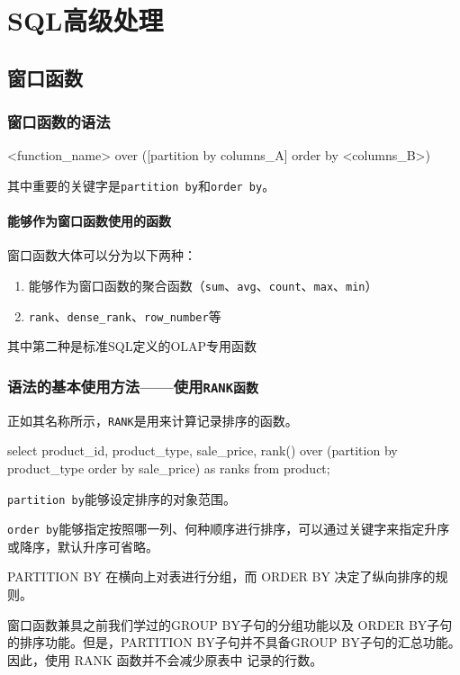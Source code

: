 \chapter{SQL高级处理}
\section{窗口函数}
\subsection{窗口函数的语法}
\begin{sqlc}
<function_name> over ([partition by columns_A] order by <columns_B>)
\end{sqlc}

其中重要的关键字是\verb|partition by|和\verb|order by|。 

\subsubsection{能够作为窗口函数使用的函数}
窗口函数大体可以分为以下两种：
\begin{enumerate}
\item 能够作为窗口函数的聚合函数（\verb|sum|、\verb|avg|、\verb|count|、\verb|max|、\verb|min|）
\item \verb|rank|、\verb|dense_rank|、\verb|row_number|等
\end{enumerate}
其中第二种是标准SQL定义的OLAP专用函数

\subsection{语法的基本使用方法——使用\texttt{RANK函数}}
正如其名称所示，\verb|RANK|是用来计算记录排序的函数。

\begin{sqlc}
select product_id, product_type, sale_price,
	rank() over (partition by product_type order by sale_price) as ranks
    from product;
\end{sqlc}

\verb|partition by|能够设定排序的对象范围。

\verb|order by|能够指定按照哪一列、何种顺序进行排序，可以通过关键字来指定升序或降序，默认升序可省略。

PARTITION BY 在横向上对表进行分组，而 ORDER BY
决定了纵向排序的规则。

窗口函数兼具之前我们学过的GROUP BY子句的分组功能以及
ORDER BY子句的排序功能。但是，PARTITION BY子句并不具备GROUP BY子句的汇总功能。因此，使用 RANK 函数并不会减少原表中
记录的行数。

